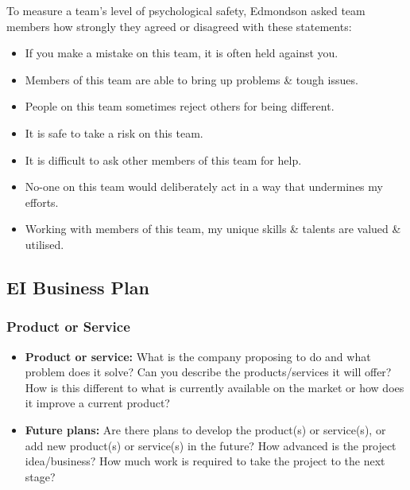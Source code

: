 \documentclass[a4paper,11pt]{article}
\begin{document}
To measure a team's level of psychological safety, Edmondson asked team members how strongly they agreed or disagreed with
these statements:
\begin{itemize}
    \item   If you make a mistake on this team, it is often held against you.
    \item   Members of this team are able to bring up problems \& tough issues.
    \item   People on this team sometimes reject others for being different.
    \item   It is safe to take a risk on this team.
    \item   It is difficult to ask other members of this team for help.
    \item   No-one on this team would deliberately act in a way that undermines my efforts.
    \item   Working with members of this team, my unique skills \& talents are valued \& utilised.
\end{itemize}
 
\subsection{EI Business Plan}
\subsubsection{Product or Service}
\begin{itemize}
    \item   \textbf{Product or service:} What is the company proposing to do and what problem does it solve?
            Can you describe the products/services it will offer?
            How is this different to what is currently available on the market or how does it improve a current product?
    \item   \textbf{Future plans:} Are there plans to develop the product(s) or service(s), or add new product(s) or 
            service(s) in the future?
            How advanced is the project idea/business?
            How much work is required  to take the project to the next stage?
\end{itemize}
\end{document}
